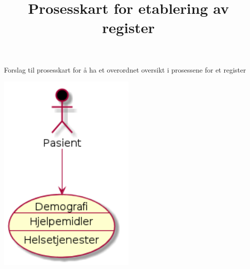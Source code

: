 \documentclass[11pt]{article}
\date{}
\title{Prosesskart for etablering av register}
\begin{document}
\maketitle
Forslag til prosesskart for å ha et overordnet oversikt i prosessene for et register

\includegraphics[width=0.5\textwidth]{test.png}
\end{document}
